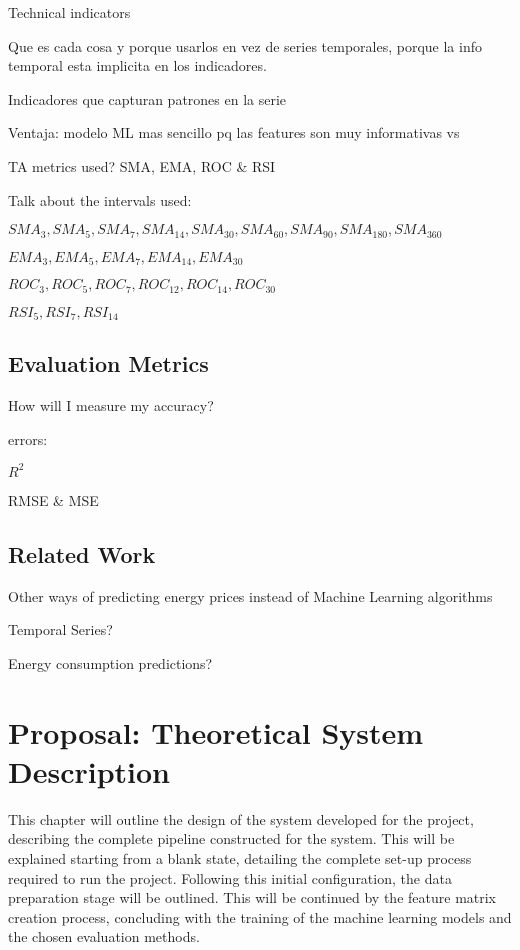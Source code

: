 \documentclass[12pt]{report} %
\begin{document}
    Technical indicators

    Que es cada cosa y porque usarlos en vez de series temporales, porque la info temporal esta implicita en los indicadores.

    Indicadores que capturan patrones en la serie

    Ventaja: modelo ML mas sencillo pq las features son muy informativas vs
    
    
    TA metrics used? SMA, EMA, ROC \& RSI

    Talk about the intervals used:
    
    $ SMA_3,SMA_5,SMA_7,SMA_{14},SMA_{30},SMA_{60},SMA_{90},SMA_{180},SMA_{360} $
    
    $ EMA_3,EMA_5,EMA_7,EMA_{14},EMA_{30} $
    
    $ ROC_3,ROC_5,ROC_7,ROC_{12},ROC_{14},ROC_{30} $
    
    $ RSI_5,RSI_7,RSI_{14} $

\section{Evaluation Metrics}
How will I measure my accuracy?

errors:

$ R^2 $

RMSE \& MSE

\section{Related Work}
Other ways of predicting energy prices instead of Machine Learning algorithms

Temporal Series?

Energy consumption predictions?





\chapter{Proposal: Theoretical System Description}

This chapter will outline the design of the system developed for the project, describing the complete pipeline constructed for the system. This will be explained starting from a blank state, detailing the complete set-up process required to run the project. Following this initial configuration, the data preparation stage will be outlined. This will be continued by the feature matrix creation process, concluding with the training of the machine learning models and the chosen evaluation methods.
\end{document}
